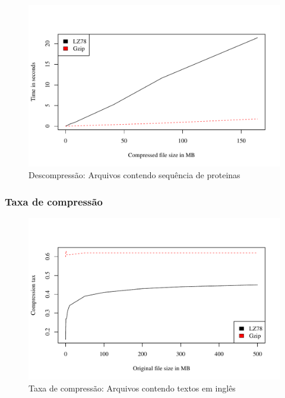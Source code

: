 \begin{figure}[ht]
\includegraphics[scale=0.74]{../experiments/R/pdf/proteins_time_decomp}
\caption{Descompressão: Arquivos contendo sequência de proteinas}
\end{figure}



\subsubsection{Taxa de compressão}

\begin{figure}[H]
\includegraphics[scale=0.74]{../experiments/R/pdf/comp_tax}
\caption{Taxa de compressão: Arquivos contendo textos em inglês}
\end{figure}

